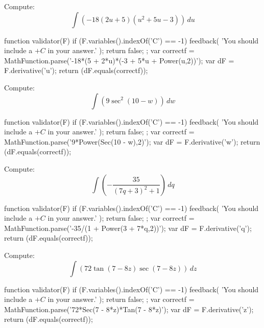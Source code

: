 \documentclass{ximera}
\renewcommand{\d}{\, d}
\begin{document}
\begin{exercise}
Compute: 
\[
\int \left(-18 (2 u+5) \left(u^2+5 u-3\right)\right)\d u
\]
\begin{expressionAnswer}
     function validator(F) {
      if (F.variables().indexOf('C') == -1) {
        feedback( 'You should include a $+C$ in your answer.' );
        return false;
      };      
      var correctf = MathFunction.parse('-18*(5 + 2*u)*(-3 + 5*u + Power(u,2))');
      var dF = F.derivative('u');
      return (dF.equals(correctf));
    }
\end{expressionAnswer}
\end{exercise}



\begin{exercise}
Compute: 
\[
\int \left(9 \sec ^2(10-w)\right)\d w
\]
\begin{expressionAnswer}
     function validator(F) {
      if (F.variables().indexOf('C') == -1) {
        feedback( 'You should include a $+C$ in your answer.' );
        return false;
      };      
      var correctf = MathFunction.parse('9*Power(Sec(10 - w),2)');
      var dF = F.derivative('w');
      return (dF.equals(correctf));
    }
\end{expressionAnswer}
\end{exercise}



\begin{exercise}
Compute: 
\[
\int \left(-\frac{35}{(7 q+3)^2+1}\right)\d q
\]
\begin{expressionAnswer}
     function validator(F) {
      if (F.variables().indexOf('C') == -1) {
        feedback( 'You should include a $+C$ in your answer.' );
        return false;
      };      
      var correctf = MathFunction.parse('-35/(1 + Power(3 + 7*q,2))');
      var dF = F.derivative('q');
      return (dF.equals(correctf));
    }
\end{expressionAnswer}
\end{exercise}



\begin{exercise}
Compute: 
\[
\int \left(72 \tan (7-8 z) \sec (7-8 z)\right)\d z
\]
\begin{expressionAnswer}
     function validator(F) {
      if (F.variables().indexOf('C') == -1) {
        feedback( 'You should include a $+C$ in your answer.' );
        return false;
      };      
      var correctf = MathFunction.parse('72*Sec(7 - 8*z)*Tan(7 - 8*z)');
      var dF = F.derivative('z');
      return (dF.equals(correctf));
    }
\end{expressionAnswer}
\end{exercise}
\end{document}
